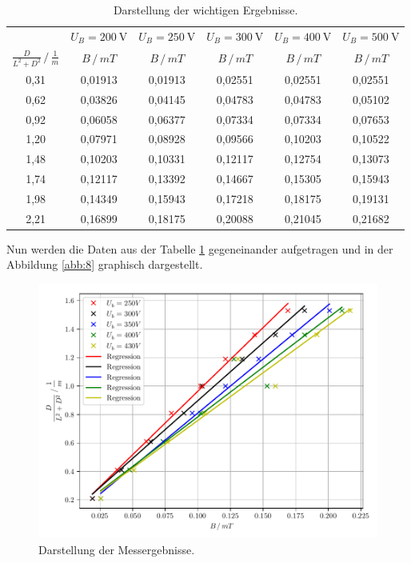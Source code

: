 \begin{table}[H]
  \centering
  \caption{Darstellung der wichtigen Ergebnisse.}
  \label{tab:5}
  \begin{tabular}{c c c c c c}
\toprule
& \multicolumn{1}{c}{$U_B=\SI{200}{\volt}$} & \multicolumn{1}{c}{$U_B=\SI{250}{\volt}$} &\multicolumn{1}{c}{$U_B=\SI{300}{\volt}$}&\multicolumn{1}{c}{$U_B=\SI{400}{\volt}$}&\multicolumn{1}{c}{$U_B=\SI{500}{\volt}$}\\
\cmidrule(lr){2-2}\cmidrule(lr){3-3}\cmidrule(lr){4-4}\cmidrule(lr){5-5}\cmidrule(lr){6-6}
$\frac{D}{L^2+D^2} \, /\, \frac{1}{m}$ & $B \,/\, mT$ & $B \,/\, mT$ &$B \,/\, mT$ &$B \,/\, mT$ &$B \,/\, mT$\\
\midrule
0,31 & 0,01913 & 0,01913 & 0,02551 & 0,02551 & 0,02551\\
0,62 & 0,03826 & 0,04145 & 0,04783 & 0,04783 & 0,05102\\
0,92 & 0,06058 & 0,06377 & 0,07334 & 0,07334 & 0,07653\\
1,20 & 0,07971 & 0,08928 & 0,09566 & 0,10203 & 0,10522\\
1,48 & 0,10203 & 0,10331 & 0,12117 & 0,12754 & 0,13073\\
1,74 & 0,12117 & 0,13392 & 0,14667 & 0,15305 & 0,15943\\
1,98 & 0,14349 & 0,15943 & 0,17218 & 0,18175 & 0,19131\\
2,21 & 0,16899 & 0,18175 & 0,20088 & 0,21045 & 0,21682\\
\bottomrule
  \end{tabular}
\end{table}
Nun werden die Daten aus der Tabelle \ref{tab:5} gegeneinander aufgetragen und
in der Abbildung \ref{abb:8} graphisch dargestellt.
\begin{figure}[H]
  \centering
  \includegraphics[width=\textwidth]{plot3.pdf}
  \caption{Darstellung der Messergebnisse.}
  \label{abb:7}
\end{figure}
